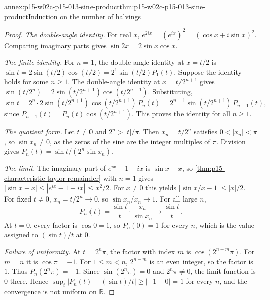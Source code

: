 \begin{annexitem}{annex:p15-w02c-p15-013-sine-product}{thm:p15-w02c-p15-013-sine-product}{Induction on the number of halvings}
\begin{proof}
\emph{The double-angle identity.} For real \(x\),
\(e^{2ix}=(e^{ix})^2=(\cos x+i\sin x)^2\). Comparing imaginary parts gives
\(\sin2x=2\sin x\cos x\).

\emph{The finite identity.} For \(n=1\), the double-angle identity at
\(x=t/2\) is \(\sin t=2\sin(t/2)\cos(t/2)=2^1\sin(t/2)P_1(t)\). Suppose the
identity holds for some \(n\geq1\). The double-angle identity at
\(x=t/2^{n+1}\) gives \(\sin(t/2^n)=2\sin(t/2^{n+1})\cos(t/2^{n+1})\).
Substituting,
\[
 \sin t=2^n\cdot2\sin(t/2^{n+1})\cos(t/2^{n+1})\,P_n(t)
       =2^{n+1}\sin(t/2^{n+1})\,P_{n+1}(t),
\]
since \(P_{n+1}(t)=P_n(t)\cos(t/2^{n+1})\). This proves the identity for all
\(n\geq1\).

\emph{The quotient form.} Let \(t\neq0\) and \(2^n>|t|/\pi\). Then
\(x_n=t/2^n\) satisfies \(0<|x_n|<\pi\), so \(\sin x_n\neq0\), as the zeros of
the sine are the integer multiples of \(\pi\). Division gives
\(P_n(t)=\sin t/(2^n\sin x_n)\).

\emph{The limit.} The imaginary part of \(e^{ix}-1-ix\) is \(\sin x-x\), so
\cref{thm:p15-characteristic-taylor-remainder} with \(n=1\) gives
\(|\sin x-x|\leq|e^{ix}-1-ix|\leq x^2/2\). For \(x\neq0\) this yields
\(|\sin x/x-1|\leq|x|/2\). For fixed \(t\neq0\), \(x_n=t/2^n\to0\), so
\(\sin x_n/x_n\to1\). For all large \(n\),
\[
 P_n(t)=\frac{\sin t}{t}\cdot\frac{x_n}{\sin x_n}\longrightarrow\frac{\sin t}{t}.
\]
At \(t=0\), every factor is \(\cos0=1\), so \(P_n(0)=1\) for every \(n\),
which is the value assigned to \((\sin t)/t\) at \(0\).

\emph{Failure of uniformity.} At \(t=2^n\pi\), the factor with index \(m\) is
\(\cos(2^{n-m}\pi)\). For \(m=n\) it is \(\cos\pi=-1\). For \(1\leq m<n\),
\(2^{n-m}\) is an even integer, so the factor is \(1\). Thus
\(P_n(2^n\pi)=-1\). Since \(\sin(2^n\pi)=0\) and \(2^n\pi\neq0\), the limit
function is \(0\) there. Hence
\(\sup_{t}|P_n(t)-(\sin t)/t|\geq|-1-0|=1\) for every \(n\), and the
convergence is not uniform on \(\mathbb R\).
\end{proof}
\end{annexitem}

